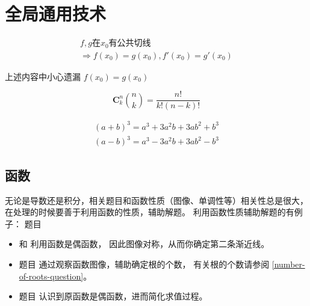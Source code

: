 \chapter{全局通用技术}

\begin{lemma}
\begin{multline*}
	f, g \mbox{在} x_0 \mbox{有公共切线} \\ \Rightarrow f(x_0) = g(x_0), f'(x_0) = g'(x_0)
\end{multline*}
\end{lemma}
上述内容中小心遗漏 $f(x_0) = g(x_0)$

\begin{definition}
    \begin{equation}
        \mathbf{C}_{k}^{n}\binom{n}{k} = \frac{n!}{k!(n-k)!}
    \end{equation}
\end{definition}

\begin{lemma}
    \begin{align*}
        (a+b)^3 = a^3 + 3a^2b + 3ab^2 + b^3\\
        (a-b)^3 = a^3 - 3a^2b + 3ab^2 - b^3
    \end{align*}
\end{lemma}

\section{函数}

无论是导数还是积分，相关题目和函数性质（图像、单调性等）相关性总是很大，
在处理的时候要善于利用函数的性质，辅助解题。
利用函数性质辅助解题的有例子：
题目 
\begin{itemize}

    \item   \cite[page 70, pdf 81, 例1]{we} 和 
            \cite[page 75, pdf 86, 例6]{we}利用函数是偶函数，
            因此图像对称，从而你确定第二条渐近线。

    \item   题目 \cite[page 77, pdf 88, 例5, 例6]{we} 
            通过观察函数图像，辅助确定根的个数，
            有关根的个数请参阅 \ref{number-of-roots-question}。

    \item   题目 \cite[page 107, pdf 118, example 4]{we}
            认识到原函数是偶函数，进而简化求值过程。

\end{itemize}

